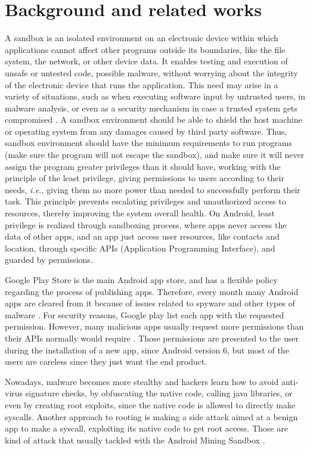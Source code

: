\section{Background and related works}

A sandbox is an isolated environment on an electronic device within which applications cannot affect other programs outside its boundaries, like the file system, the network, or other device data. It enables testing and execution of unsafe or untested code, possible malware, without worrying about the integrity of the electronic device that runs the application. This need may arise in a variety of situations, such as when executing software input by untrusted users, in malware analysis, or even as a security mechanism in case a trusted system gets compromised \cite{DBLP:journals/peerj-cs/MaassSCS16}.
A sandbox environment should be able to shield the host machine or operating system from any damages caused by third party software. Thus, sandbox environment should have the minimum requirements to run programs (make sure the program will not escape the sandbox), and make sure it will never assign the program greater privileges than it should have, 
working with the principle of the least privilege, giving permissions to users according to their needs, \textit{i.e.}, giving them no more power than needed to successfully perform their task. This principle prevents escalating privileges and unauthorized access to resources, thereby improving the system overall health. On Android, least privilege is realized through sandboxing process, where apps never access the data of other apps, and an app just access user resources, like contacts and location, through specific APIs (Application Programming Interface), and guarded by permissions.

Google Play Store is the main Android app store, and has a flexible policy regarding the process of publishing apps. Therefore, every month many Android apps are cleared from it because of issues related to spyware and other types of malware \cite{DBLP:conf/msr/WangLL0X18}. For security reasons, Google play list each app with the requested permission. However, many malicious apps usually request more permissions than their APIs normally would require \cite{DBLP:conf/ccs/FeltCHSW11}. Those permissions are presented to the user during the installation of a new app, since Android version 6, but most of the users are careless since they just want the end product.

Nowadays, malware becomes more stealthy and hackers learn how to avoid anti-virus signature checks, by obfuscating the native code, calling java libraries, or even by creating root exploits, since the native code is allowed to directly make syscalls. Another approach to rooting is making a side attack aimed at a benign app to make a syscall, exploiting its native code to get root access. Those are kind of attack that usually tackled with the Android Mining Sandbox \cite{DBLP:conf/icse/JamrozikSZ16}.

